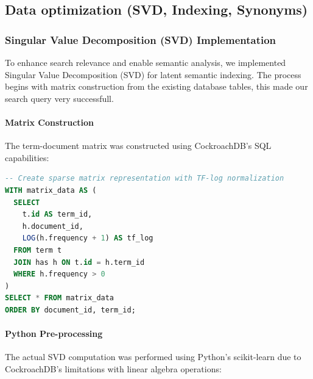 \documentclass[twoside]{article}
\begin{document}
\subsection{Data optimization (SVD, Indexing, Synonyms)}

\subsubsection{Singular Value Decomposition (SVD) Implementation}

To enhance search relevance and enable semantic analysis, we implemented Singular Value Decomposition (SVD) for latent semantic indexing. The process begins with matrix construction from the existing database tables, this made our search query very successfull.

\paragraph{Matrix Construction}
The term-document matrix was constructed using CockroachDB's SQL capabilities:

\begin{lstlisting}[language=SQL,caption={Term-Document Matrix Construction},label={lst:matrix}]
-- Create sparse matrix representation with TF-log normalization
WITH matrix_data AS (
  SELECT 
    t.id AS term_id,
    h.document_id,
    LOG(h.frequency + 1) AS tf_log 
  FROM term t
  JOIN has h ON t.id = h.term_id
  WHERE h.frequency > 0
)
SELECT * FROM matrix_data
ORDER BY document_id, term_id;
\end{lstlisting}

\paragraph{Python Pre-processing}
The actual SVD computation was performed using Python's scikit-learn due to CockroachDB's limitations with linear algebra operations:
\end{document}
